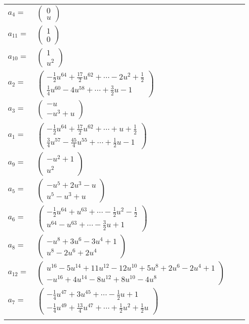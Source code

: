 \documentclass[1p]{elsarticle_modified}
\theoremstyle{definition}
\begin{document}
\begin{tabular}{m{7pt} m{180pt} m{7pt} m{180pt} }
\flushright $a_{4}=$&$\begin{pmatrix}0\\u\end{pmatrix}$ \\
\flushright $a_{11}=$&$\begin{pmatrix}1\\0\end{pmatrix}$ \\
\flushright $a_{10}=$&$\begin{pmatrix}1\\u^2\end{pmatrix}$ \\
\flushright $a_{2}=$&$\begin{pmatrix}-\frac{1}{2} u^{64}+\frac{17}{2} u^{62}+\cdots-2 u^2+\frac{1}{2}\\\frac{1}{4} u^{60}-4 u^{58}+\cdots+\frac{3}{2} u-1\end{pmatrix}$ \\
\flushright $a_{3}=$&$\begin{pmatrix}- u\\- u^3+u\end{pmatrix}$ \\
\flushright $a_{1}=$&$\begin{pmatrix}-\frac{1}{2} u^{64}+\frac{17}{2} u^{62}+\cdots+u+\frac{1}{2}\\\frac{3}{4} u^{57}-\frac{45}{4} u^{55}+\cdots+\frac{1}{2} u-1\end{pmatrix}$ \\
\flushright $a_{9}=$&$\begin{pmatrix}- u^2+1\\u^2\end{pmatrix}$ \\
\flushright $a_{5}=$&$\begin{pmatrix}- u^5+2 u^3- u\\u^5- u^3+u\end{pmatrix}$ \\
\flushright $a_{6}=$&$\begin{pmatrix}-\frac{1}{2} u^{64}+u^{63}+\cdots-\frac{1}{2} u^2-\frac{1}{2}\\u^{64}- u^{63}+\cdots-\frac{3}{2} u+1\end{pmatrix}$ \\
\flushright $a_{8}=$&$\begin{pmatrix}- u^8+3 u^6-3 u^4+1\\u^8-2 u^6+2 u^4\end{pmatrix}$ \\
\flushright $a_{12}=$&$\begin{pmatrix}u^{16}-5 u^{14}+11 u^{12}-12 u^{10}+5 u^8+2 u^6-2 u^4+1\\- u^{16}+4 u^{14}-8 u^{12}+8 u^{10}-4 u^8\end{pmatrix}$ \\
\flushright $a_{7}=$&$\begin{pmatrix}-\frac{1}{4} u^{47}+3 u^{45}+\cdots-\frac{1}{2} u+1\\-\frac{1}{4} u^{49}+\frac{13}{4} u^{47}+\cdots+\frac{1}{2} u^2+\frac{1}{2} u\end{pmatrix}$\\&\end{tabular}
\end{document}
